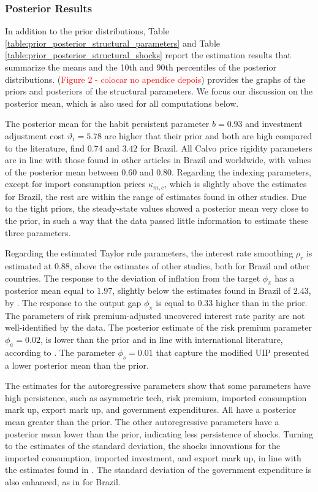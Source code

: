 \documentclass[12pt,oneside,a4paper]{article}
\begin{document}
\subsubsection{Posterior Results}
In addition to the prior distributions, Table \ref{table:prior_posterior_structural_parameters} and Table \ref{table:prior_posterior_structural_shocks} report the estimation results that
summarize the means and the 10th and 90th percentiles of the posterior distributions.
(\textcolor{red}{Figure 2 - colocar no apendice depois}) provides the graphs of the priors and posteriors of the structural parameters. We focus our discussion on the posterior mean, which is also used for all computations below.

The posterior mean for the habit persistent parameter $b = 0.93$ and investment adjustment cost $\vartheta_{i} = 5.78$ are higher that their prior and both are high compared to the literature, \citet{Castro:2015} find $0.74$ and $3.42$ for Brazil. All Calvo price rigidity parameters are in line with those found in other articles in Brazil and worldwide, with values of the posterior mean between $0.60$ and $0.80$. Regarding the indexing parameters, except for import consumption prices $\kappa_{m,c}$, which is slightly above the estimates for Brazil, the rest are within the range of estimates found in other studies. Due to the tight priors, the steady-state values showed a posterior mean very close to the prior, in such a way that the data passed little information to estimate these three parameters.

Regarding the estimated Taylor rule parameters, the interest rate smoothing $\rho_r$ is estimated at $0.88$, above the estimates of other studies, both for Brazil and other countries. The response to the deviation of inflation  from the target $\phi_{\pi}$ has a posterior mean equal to $1.97$, slightly below the estimates found in Brazil of $2.43$, by \citet{Castro:2015}. The response to the output gap $\phi_{\pi}$ is equal to $0.33$ higher than in the prior. The parameters of risk premium-adjusted uncovered interest rate parity are not well-identified by the data. The posterior estimate of the risk premium parameter $\phi_{a} = 0.02$, is lower than the prior and in line with international literature, according to \citet{Adolfson:2008}. The parameter $\phi_s = 0.01$ that capture the modified UIP presented a lower posterior mean than the prior.

The estimates for the autoregressive parameters show that some parameters have high persistence, such as asymmetric tech, risk premium, imported consumption mark up, export mark up, and government expenditures. All have a posterior mean greater than the prior. The other autoregressive parameters have a posterior mean lower than the prior, indicating less persistence of shocks. Turning to the estimates of the standard deviation, the shocks innovations for the imported consumption, imported investment, and export mark up, in line with the estimates found in \citet{Adolfson:2007}. The standard deviation of the government expenditure is also enhanced, as in \citet{Castro:2015} for Brazil.
\end{document}
